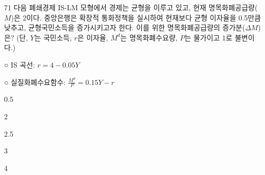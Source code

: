 \begin{question}{71}
다음 폐쇄경제 IS-LM 모형에서 경제는 균형을 이루고 있고, 현재 명목화폐공급량($M$)은 2이다. 중앙은행은 확장적 통화정책을 실시하여 현재보다 균형 이자율을 0.5만큼 낮추고, 균형국민소득을 증가시키고자 한다. 이를 위한 명목화폐공급량의 증가분($\Delta M$)은? (단, $Y$는 국민소득, $r$은 이자율, $M^{d}$는 명목화폐수요량, $P$는 물가이고 1로 불변이다.)
\begin{framedtext}
○ IS 곡선: $r=4-0.05Y$ \par
○ 실질화폐수요함수: $\frac{M^{d}}{P}=0.15Y-r$
\end{framedtext}
\begin{choices}
  \item 0.5
  \item 2
  \item 2.5
  \item 3
  \item 4
\end{choices}
\end{question}
